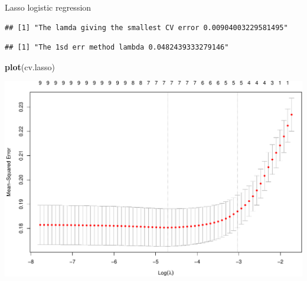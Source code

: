 \documentclass[
  ignorenonframetext,
]{beamer}
\newenvironment{Shaded}{\begin{snugshade}}{\end{snugshade}}
\newcommand{\DataTypeTok}[1]{\textcolor[rgb]{0.13,0.29,0.53}{#1}}
\newcommand{\DecValTok}[1]{\textcolor[rgb]{0.00,0.00,0.81}{#1}}
\newcommand{\FloatTok}[1]{\textcolor[rgb]{0.00,0.00,0.81}{#1}}
\newcommand{\KeywordTok}[1]{\textcolor[rgb]{0.13,0.29,0.53}{\textbf{#1}}}
\newcommand{\NormalTok}[1]{#1}
\newcommand{\OperatorTok}[1]{\textcolor[rgb]{0.81,0.36,0.00}{\textbf{#1}}}
\newcommand{\StringTok}[1]{\textcolor[rgb]{0.31,0.60,0.02}{#1}}
\begin{document}
\begin{frame}[fragile]
\begin{block}{Lasso logistic regression}
\begin{Shaded}
\end{Shaded}

\begin{verbatim}
## [1] "The lamda giving the smallest CV error 0.00904003229581495"
\end{verbatim}

\begin{Shaded}
\end{Shaded}

\begin{verbatim}
## [1] "The 1sd err method lambda 0.0482439333279146"
\end{verbatim}

\begin{Shaded}
\begin{Highlighting}[]
\KeywordTok{plot}\NormalTok{(cv.lasso)}
\end{Highlighting}
\end{Shaded}

\includegraphics{L3_files/figure-beamer/unnamed-chunk-8-2.pdf}


\end{block}
\end{frame}
\end{document}
